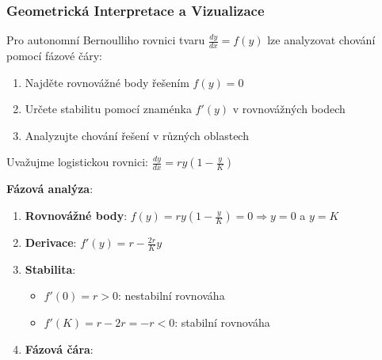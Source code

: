 \vspace{0.8\baselineskip}

\subsubsection{Geometrická Interpretace a Vizualizace}
\label{subsubsec:l2-geometricka-interpretace}

\begin{method}
\label{met:fazova-cara}
Pro autonomní Bernoulliho rovnici tvaru $\frac{dy}{dx} = f(y)$ lze analyzovat chování pomocí fázové čáry:

\begin{enumerate}
\item Najděte rovnovážné body řešením $f(y) = 0$
\item Určete stabilitu pomocí znaménka $f'(y)$ v rovnovážných bodech
\item Analyzujte chování řešení v různých oblastech
\end{enumerate}
\end{method}

\vspace{0.6\baselineskip}

\begin{example}
\label{ex:fazova-analyza-logisticka}
Uvažujme logistickou rovnici: $\frac{dy}{dx} = ry\left(1 - \frac{y}{K}\right)$

\textbf{Fázová analýza}:
\begin{enumerate}
\item \textbf{Rovnovážné body}: $f(y) = ry(1 - \frac{y}{K}) = 0 \Rightarrow y = 0$ a $y = K$
\item \textbf{Derivace}: $f'(y) = r - \frac{2r}{K}y$
\item \textbf{Stabilita}:
\begin{itemize}
\item $f'(0) = r > 0$: nestabilní rovnováha
\item $f'(K) = r - 2r = -r < 0$: stabilní rovnováha
\end{itemize}
\item \textbf{Fázová čára}:
\begin{center}
\end{center}
\end{enumerate}
\end{example}

